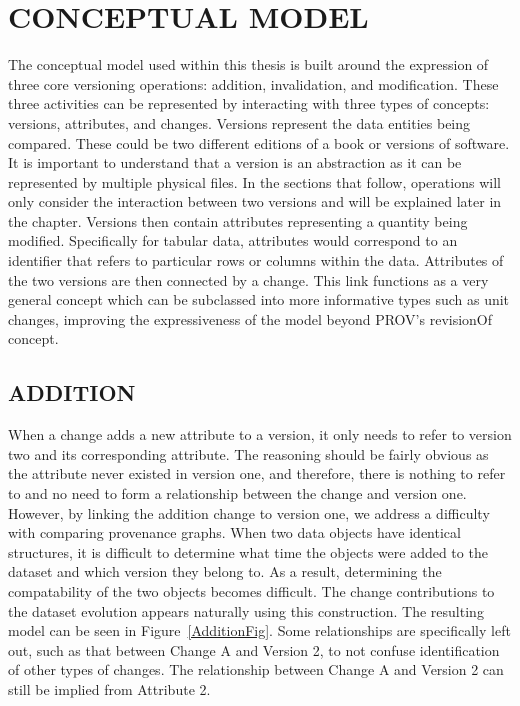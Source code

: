 
\chapter{CONCEPTUAL MODEL}\label{ch:model}

The conceptual model used within this thesis is built around the expression of three core versioning operations: addition, invalidation, and modification.  These three activities can be represented by interacting with three types of concepts: versions, attributes, and changes.  Versions represent the data entities being compared.  These could be two different editions of a book or versions of software.  It is important to understand that a version is an abstraction as it can be represented by multiple physical files.  In the sections that follow, operations will only consider the interaction between two versions and will be explained later in the chapter.  Versions then contain attributes representing a quantity being modified.  Specifically for tabular data, attributes would correspond to an identifier that refers to particular rows or columns within the data.  Attributes of the two versions are then connected by a change.  This link functions as a very general concept which can be subclassed into more informative types such as unit changes, improving the expressiveness of the model beyond PROV's revisionOf concept.

\section{ADDITION}

When a change adds a new attribute to a version, it only needs to refer to version two and its corresponding attribute.  The reasoning should be fairly obvious as the attribute never existed in version one, and therefore, there is nothing to refer to and no need to form a relationship between the change and version one.  However, by linking the addition change to version one, we address a difficulty with comparing provenance graphs.  When two data objects have identical structures, it is difficult to determine what time the objects were added to the dataset and which version they belong to.  As a result, determining the compatability of the two objects becomes difficult.  The change contributions to the dataset evolution appears naturally using this construction. The resulting model can be seen in Figure~\ref{AdditionFig}.  Some relationships are specifically left out, such as that between Change A and Version 2, to not confuse identification of other types of changes.  The relationship between Change A and Version 2 can still be implied from Attribute 2.

